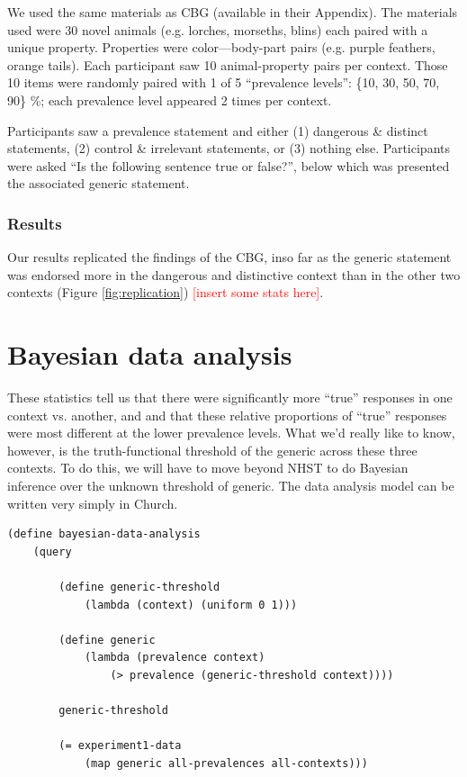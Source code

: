 \documentclass[10pt,letterpaper]{article}
\newcommand{\red}[1]{\textcolor{Red}{#1}}
\begin{document}
We used the same materials as CBG (available in their Appendix). The materials used were 30 novel animals (e.g. lorches, morseths, blins) each paired with a unique property. Properties were color---body-part pairs (e.g. purple feathers, orange tails). Each participant saw 10 animal-property pairs per context. Those 10 items were randomly paired with 1 of 5 ``prevalence levels'': \{10, 30, 50, 70, 90\} \%; each prevalence level appeared 2 times per context. 

Participants saw a prevalence statement and either (1) dangerous \& distinct statements, (2) control \& irrelevant statements, or (3) nothing else. Participants were asked ``Is the following sentence true or false?'', below which was presented the associated generic statement. 

\subsubsection{Results}

Our results replicated the findings of the CBG, inso far as the generic statement was endorsed more in the dangerous and distinctive context than in the other two contexts (Figure \ref{fig:replication}) \red{[insert some stats here]}. 

\section{Bayesian data analysis}

These statistics tell us that there were significantly more ``true'' responses in one context vs. another, and and that these relative proportions of ``true'' responses were most different at the lower prevalence levels. What we'd really like to know, however, is the truth-functional threshold of the generic across these three contexts. To do this, we will have to move beyond NHST to do Bayesian inference over the unknown threshold of generic. The data analysis model can be written very simply in Church.

\begin{lstlisting}
(define bayesian-data-analysis 
	(query
	
		(define generic-threshold 
			(lambda (context) (uniform 0 1)))
	
		(define generic 
			(lambda (prevalence context) 
				(> prevalence (generic-threshold context))))
				
		generic-threshold
		
		(= experiment1-data 
			(map generic all-prevalences all-contexts)))
\end{lstlisting}
\end{document}
